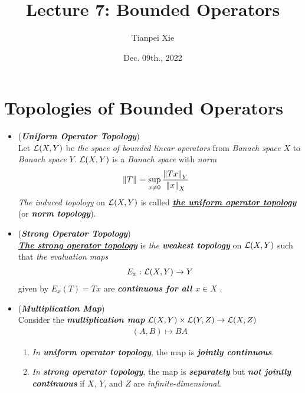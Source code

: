 \documentclass[11pt]{article}
\begin{document}
\title{Lecture 7: Bounded Operators}
\author{ Tianpei Xie}
\date{ Dec. 09th., 2022 }
\maketitle
\tableofcontents
\newpage
\section{Topologies of Bounded Operators}
\begin{itemize}
\item \begin{definition}(\emph{\textbf{Uniform Operator Topology}})\\
Let ${\mathcal L}(X, Y)$ be \emph{the space of bounded linear operators} from \emph{Banach space} $X$ to \emph{Banach space} $Y$.  ${\mathcal L}(X, Y)$ is a \emph{Banach space} with \emph{norm}
\begin{align*}
\left\|T\right\|_{} &= \sup_{x \neq 0}\frac{\left\|Tx\right\|_{Y}}{\left\|x\right\|_{X}}
\end{align*} \emph{The induced topology} on ${\mathcal L}(X, Y)$ is called \underline{\emph{\textbf{the uniform operator topology}}} (or \emph{\textbf{norm topology}}). 
\end{definition}


\item \begin{definition} (\emph{\textbf{Strong Operator Topology}})\\
\underline{\emph{\textbf{The strong operator topology}}} is \emph{the \textbf{weakest topology}} on ${\mathcal L}(X, Y)$ such 
that \emph{the evaluation maps} 
\begin{align*}
E_x: {\mathcal L}(X, Y) \rightarrow Y
\end{align*} given by $E_x(T) = Tx$ are \emph{\textbf{continuous for all $x \in X$}} . 
\end{definition}

\item \begin{remark} (\emph{\textbf{Multiplication Map}})\\
Consider the \emph{\textbf{multiplication map}} ${\mathcal L}(X, Y) \times {\mathcal L}(Y, Z) \rightarrow {\mathcal L}(X, Z)$
\begin{align*}
(A, B) \mapsto BA
\end{align*}
\begin{enumerate}
\item \emph{In \textbf{uniform operator topology}},  the map is \emph{\textbf{jointly continuous}}. 
\item \emph{In \textbf{strong operator topology}}, the map is \emph{\textbf{separately}} but \emph{\textbf{not jointly continuous}} if $X$, $Y$, and $Z$ are \emph{infinite-dimensional}.
\end{enumerate}
\end{remark}



\end{itemize}
\end{document}
